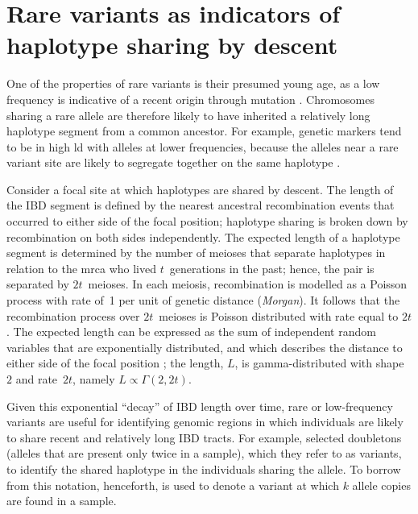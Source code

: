%
\section{Rare variants as indicators of haplotype sharing by descent}
\label{sec:rarevars}
%

One of the properties of rare variants is their presumed young age, as a low frequency is indicative of a recent origin through mutation
\citep{Kimura:1973ug,Griffiths:2013ec}.
Chromosomes sharing a rare allele are therefore likely to have inherited a relatively long haplotype segment from a common ancestor.
For example, genetic markers tend to be in high \gls{ld} with alleles at lower frequencies, because the alleles near a rare variant site are likely to segregate together on the same haplotype \citep{Kruglyak:1999dp,Slatkin:2008ks}.

Consider a focal site at which  haplotypes are shared by descent.
The length of the IBD segment is defined by the nearest ancestral recombination events that occurred to either side of the focal position; \ie haplotype sharing is broken down by recombination on both sides independently.
The expected length of a haplotype segment is determined by the number of meioses that separate  haplotypes in relation to the \gls{mrca} who lived $t$~generations in the past; hence, the pair is separated by ${2 t}$~meioses.
In each meiosis, recombination is modelled as a Poisson process with rate of~1 per unit of genetic distance (\emph{Morgan}).
It follows that the recombination process over ${2 t}$~meioses is Poisson distributed with rate equal to ${2 t}$.
The expected length can be expressed as the sum of  independent random variables that are exponentially distributed, and which describes the distance to either side of the focal position \citep[see][]{Wakeley2016book}; \ie the length, $L$, is gamma-distributed with shape~$2$ and rate~${2 t}$, namely ${L \propto \Gamma(2, 2 t)}$.

%

%

Given this exponential ``decay'' of IBD length over time, rare or low-frequency variants are useful for identifying genomic regions in which individuals are likely to share recent and relatively long IBD tracts.
For example, \citet{Mathieson:2014ig} selected doubletons (alleles that are present only twice in a sample), which they refer to as  variants, to identify the shared haplotype in the  individuals sharing the allele.
To borrow from this notation, henceforth, \fk{} is used to denote a variant at which $k$ allele copies are found in a sample.

